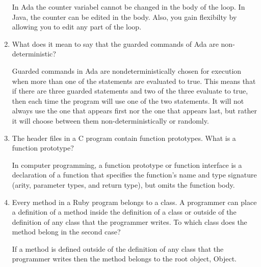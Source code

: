 \begin{enumerate}
  \begin{answer}

    In Ada the counter variabel cannot be changed in the body of the loop. In Java, the counter can be edited in the body. Also, you gain flexibilty by allowing you to edit any part of the loop.

    \end{answer}


  \item What does it mean to say that the guarded commands
    of Ada are non-deterministic?

  \begin{answer}

 Guarded commands in Ada are nondeterministically chosen for execution when more than one of the statements are evaluated to true. This means that if there are three guarded statements and two of the three evaluate to true, then each time the program will use one of the two statements. It will not always use the one that appears first nor the one that appears last, but rather it will choose between them non-deterministically or randomly.

    \end{answer}


  \item The header files in a C program contain function
    prototypes. What is a function prototype?

  \begin{answer}

    In computer programming, a function prototype or function interface is a declaration of a function that specifies the function's name and type signature (arity, parameter types, and return type), but omits the function body. 

    \end{answer}


  \item Every method in a Ruby program belongs to a class.
    A programmer can place a definition of a method inside
    the definition of a class or outside of the definition
    of any class that the programmer writes. To which class
    does the method belong in the second case?

  \begin{answer}

   If a method is defined outside of the definition of any class that the programmer writes then the method belongs to the root object, Object.

    \end{answer}



\end{enumerate}
